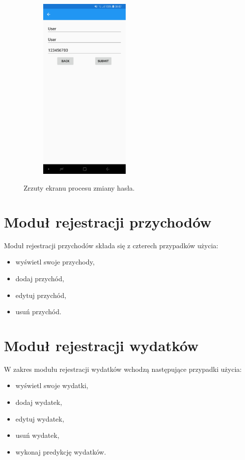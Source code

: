 \begin{figure}[!ht]
\begin{center}
\begin{subfigure}[b]{0.3\textwidth}
			\label{haslo}
		\end{subfigure}
		\begin{subfigure}[b]{0.3\textwidth}
			\includegraphics[width=1.75in]{img/mobile/edycja_uzytkownika.jpg}
			\label{haslo_blad}
		\end{subfigure}
	\end{center}
	\caption{Zrzuty ekranu procesu zmiany hasła.}
\end{figure}
\section{Moduł rejestracji przychodów}
Moduł rejestracji przychodów składa się z czterech przypadków użycia:
\begin{itemize}
\item wyświetl swoje przychody,
\item dodaj przychód,
\item edytuj przychód,
\item usuń przychód.
\end{itemize}

\section{Moduł rejestracji wydatków}
W zakres modułu rejestracji wydatków wchodzą następujące przypadki użycia:
\begin{itemize}
	\item wyświetl swoje wydatki,
	\item dodaj wydatek,
	\item edytuj wydatek,
	\item usuń wydatek,
	\item wykonaj predykcję wydatków.
\end{itemize}

